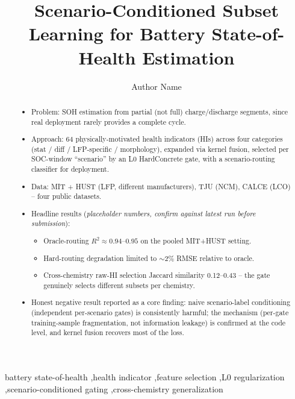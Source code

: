 \documentclass[preprint,12pt]{elsarticle}
\begin{document}
\begin{frontmatter}

\title{Scenario-Conditioned Subset Learning for Battery State-of-Health Estimation}

\author[label1]{Author Name}
\address[label1]{Affiliation, Address}

\begin{abstract}
\begin{itemize}
  \item Problem: SOH estimation from partial (not full) charge/discharge segments, since real deployment rarely provides a complete cycle.
  \item Approach: 64 physically-motivated health indicators (HIs) across four categories (stat / diff / LFP-specific / morphology), expanded via kernel fusion, selected per SOC-window ``scenario'' by an L0 HardConcrete gate, with a scenario-routing classifier for deployment.
  \item Data: MIT + HUST (LFP, different manufacturers), TJU (NCM), CALCE (LCO) -- four public datasets.
  \item Headline results (\emph{placeholder numbers, confirm against latest run before submission}):
  \begin{itemize}
    \item Oracle-routing $R^2 \approx 0.94$--$0.95$ on the pooled MIT+HUST setting.
    \item Hard-routing degradation limited to $\sim$2\% RMSE relative to oracle.
    \item Cross-chemistry raw-HI selection Jaccard similarity 0.12--0.43 -- the gate genuinely selects different subsets per chemistry.
  \end{itemize}
  \item Honest negative result reported as a core finding: naive scenario-label conditioning (independent per-scenario gates) is consistently harmful; the mechanism (per-gate training-sample fragmentation, not information leakage) is confirmed at the code level, and kernel fusion recovers most of the loss.
\end{itemize}
\end{abstract}

\begin{keyword}
battery state-of-health \sep health indicator \sep feature selection \sep L0 regularization \sep scenario-conditioned gating \sep cross-chemistry generalization
\end{keyword}

\end{frontmatter}
\end{document}
